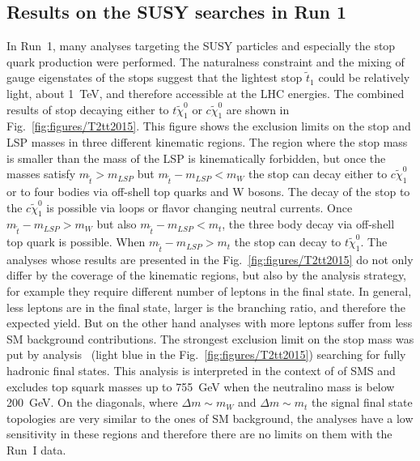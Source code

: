 \subsection{Results on the SUSY searches in Run 1}


In Run~1, many analyses targeting the SUSY particles and especially the stop quark production were performed. The naturalness constraint and the mixing of gauge eigenstates of the stops suggest that the lightest stop $\tilde{t}_{1}$ could be relatively light, about 1~TeV, and therefore accessible at the LHC energies. The combined results of stop decaying either to $t \tilde{\chi}_{1}^0$ or $c \tilde{\chi}_{1}^0$ are shown in Fig.~\ref{fig:figures/T2tt2015}. This figure shows the exclusion limits on the stop and LSP masses in three different kinematic regions. The region where the stop mass is smaller than the mass of the LSP is kinematically forbidden, but once the masses satisfy $m_{\tilde{t}} > m_{LSP}$ but $m_{\tilde{t}} - m_{LSP} < m_{W}$ the stop can decay either to $c \tilde{\chi}_{1}^0$ or to four bodies via off-shell top quarks and W bosons. The decay of the stop to the $c \tilde{\chi}_{1}^0$ is possible via loops or flavor changing neutral currents.  Once  $m_{\tilde{t}} - m_{LSP} > m_{W}$ but also  $m_{\tilde{t}} - m_{LSP} < m_{t}$, the three body decay via off-shell top quark is possible. When  $m_{\tilde{t}} - m_{LSP} > m_{t}$  the stop can decay to $t \tilde{\chi}_{1}^0$. The analyses whose results are presented in the Fig.~\ref{fig:figures/T2tt2015} do not only differ by the coverage of the kinematic regions, but also by the analysis strategy, for example they require different number of leptons in the final state. In general, less leptons are in the final state, larger is the branching ratio, and therefore the expected yield. But on the other hand analyses with more leptons suffer from less SM background contributions.  The strongest exclusion limit on the stop mass was put by analysis~\cite{Khachatryan:2016oia} (light blue in the Fig.~\ref{fig:figures/T2tt2015}) searching for fully hadronic final states. This analysis is interpreted in the context of of SMS and excludes top squark masses up to 755~GeV when the neutralino mass is below 200~GeV. On the diagonals, where $\Delta m \sim m_{W}$ and $\Delta m \sim m_{t}$ the signal final state topologies are very similar to the ones of SM background, the analyses have a low sensitivity in these regions and therefore there are no limits on them with the Run~I data.

